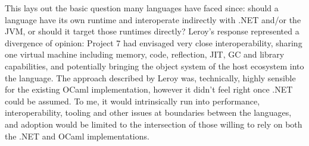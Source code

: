 \documentclass[acmsmall,review]{acmart}\settopmatter{printfolios=true,printccs=false,printacmref=false}
\begin{document}
This lays out the basic question many languages have faced since: should a language have its own runtime and interoperate indirectly with .NET and/or the JVM, or should it target those runtimes directly?  Leroy’s response represented a divergence of opinion: Project 7 had envisaged very close interoperability, sharing one virtual machine including memory, code, reflection, JIT, GC and library capabilities, and potentially bringing the object system of the host ecosystem into the language.  The approach described by Leroy was, technically, highly sensible for the existing OCaml implementation, however it didn’t feel right once .NET could be assumed. To me, it would intrinsically run into performance, interoperability, tooling and other issues at boundaries between the languages, and adoption would be limited to the intersection of those willing to rely on both the .NET and OCaml implementations.
\end{document}
